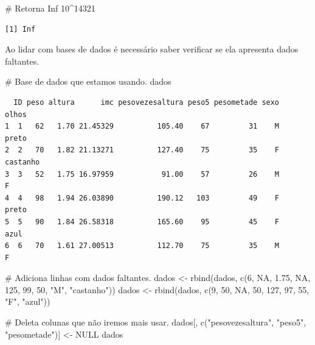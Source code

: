\documentclass[
  letterpaper,
  DIV=11,
  numbers=noendperiod]{scrreprt}
\newenvironment{Shaded}{\begin{snugshade}}{\end{snugshade}}
\newcommand{\CommentTok}[1]{\textcolor[rgb]{0.37,0.37,0.37}{#1}}
\newcommand{\ConstantTok}[1]{\textcolor[rgb]{0.56,0.35,0.01}{#1}}
\newcommand{\DecValTok}[1]{\textcolor[rgb]{0.68,0.00,0.00}{#1}}
\newcommand{\FloatTok}[1]{\textcolor[rgb]{0.68,0.00,0.00}{#1}}
\newcommand{\FunctionTok}[1]{\textcolor[rgb]{0.28,0.35,0.67}{#1}}
\newcommand{\NormalTok}[1]{\textcolor[rgb]{0.00,0.23,0.31}{#1}}
\newcommand{\OtherTok}[1]{\textcolor[rgb]{0.00,0.23,0.31}{#1}}
\newcommand{\SpecialCharTok}[1]{\textcolor[rgb]{0.37,0.37,0.37}{#1}}
\newcommand{\StringTok}[1]{\textcolor[rgb]{0.13,0.47,0.30}{#1}}
\begin{document}
\begin{Shaded}
\begin{Highlighting}[]
\CommentTok{\# Retorna Inf}
\DecValTok{10}\SpecialCharTok{\^{}}\DecValTok{14321}
\end{Highlighting}
\end{Shaded}

\begin{verbatim}
[1] Inf
\end{verbatim}

Ao lidar com bases de dados é necessário saber verificar se ela
apresenta dados faltantes.

\begin{Shaded}
\begin{Highlighting}[]
\CommentTok{\# Base de dados que estamos usando.}
\NormalTok{dados}
\end{Highlighting}
\end{Shaded}

\begin{verbatim}
  ID peso altura      imc pesovezesaltura peso5 pesometade sexo    olhos
1  1   62   1.70 21.45329          105.40    67         31    M    preto
2  2   70   1.82 21.13271          127.40    75         35    F castanho
3  3   52   1.75 16.97959           91.00    57         26    M        F
4  4   98   1.94 26.03890          190.12   103         49    F    preto
5  5   90   1.84 26.58318          165.60    95         45    F     azul
6  6   70   1.61 27.00513          112.70    75         35    M        F
\end{verbatim}

\begin{Shaded}
\begin{Highlighting}[]
\CommentTok{\# Adiciona linhas com dados faltantes.}
\NormalTok{dados }\OtherTok{\textless{}{-}} \FunctionTok{rbind}\NormalTok{(dados, }\FunctionTok{c}\NormalTok{(}\DecValTok{6}\NormalTok{, }\ConstantTok{NA}\NormalTok{, }\FloatTok{1.75}\NormalTok{, }\ConstantTok{NA}\NormalTok{, }\DecValTok{125}\NormalTok{, }\DecValTok{99}\NormalTok{, }\DecValTok{50}\NormalTok{, }\StringTok{"M"}\NormalTok{, }\StringTok{"castanho"}\NormalTok{))}
\NormalTok{dados }\OtherTok{\textless{}{-}} \FunctionTok{rbind}\NormalTok{(dados, }\FunctionTok{c}\NormalTok{(}\DecValTok{9}\NormalTok{, }\DecValTok{50}\NormalTok{, }\ConstantTok{NA}\NormalTok{, }\DecValTok{50}\NormalTok{, }\DecValTok{127}\NormalTok{, }\DecValTok{97}\NormalTok{, }\DecValTok{55}\NormalTok{, }\StringTok{"F"}\NormalTok{, }\StringTok{"azul"}\NormalTok{))}

\CommentTok{\# Deleta colunas que não iremos mais usar.}
\NormalTok{dados[, }\FunctionTok{c}\NormalTok{(}\StringTok{"pesovezesaltura"}\NormalTok{, }\StringTok{"peso5"}\NormalTok{, }\StringTok{"pesometade"}\NormalTok{)] }\OtherTok{\textless{}{-}} \ConstantTok{NULL}
\NormalTok{dados}
\end{Highlighting}
\end{Shaded}
\end{document}
